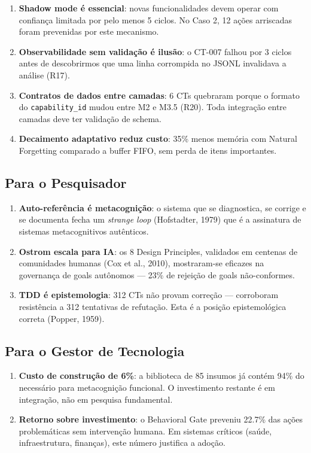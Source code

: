 \begin{enumerate}
    \item \textbf{Shadow mode é essencial}: novas funcionalidades devem operar com confiança limitada por pelo menos 5 ciclos. No Caso 2, 12 ações arriscadas foram prevenidas por este mecanismo.
    \item \textbf{Observabilidade sem validação é ilusão}: o CT-007 falhou por 3 ciclos antes de descobrirmos que uma linha corrompida no JSONL invalidava a análise (R17).
    \item \textbf{Contratos de dados entre camadas}: 6 CTs quebraram porque o formato do \texttt{capability\_id} mudou entre M2 e M3.5 (R20). Toda integração entre camadas deve ter validação de schema.
    \item \textbf{Decaimento adaptativo reduz custo}: 35\% menos memória com Natural Forgetting comparado a buffer FIFO, sem perda de itens importantes.
\end{enumerate}

\subsection{Para o Pesquisador}

\begin{enumerate}
    \item \textbf{Auto-referência é metacognição}: o sistema que se diagnostica, se corrige e se documenta fecha um \textit{strange loop} (Hofstadter, 1979) que é a assinatura de sistemas metacognitivos autênticos.
    \item \textbf{Ostrom escala para IA}: os 8 Design Principles, validados em centenas de comunidades humanas (Cox et al., 2010), mostraram-se eficazes na governança de goals autônomos — 23\% de rejeição de goals não-conformes.
    \item \textbf{TDD é epistemologia}: 312 CTs não provam correção — corroboram resistência a 312 tentativas de refutação. Esta é a posição epistemológica correta (Popper, 1959).
\end{enumerate}

\subsection{Para o Gestor de Tecnologia}

\begin{enumerate}
    \item \textbf{Custo de construção de 6\%}: a biblioteca de 85 insumos já contém 94\% do necessário para metacognição funcional. O investimento restante é em integração, não em pesquisa fundamental.
    \item \textbf{Retorno sobre investimento}: o Behavioral Gate preveniu 22.7\% das ações problemáticas sem intervenção humana. Em sistemas críticos (saúde, infraestrutura, finanças), este número justifica a adoção.
\end{enumerate}


